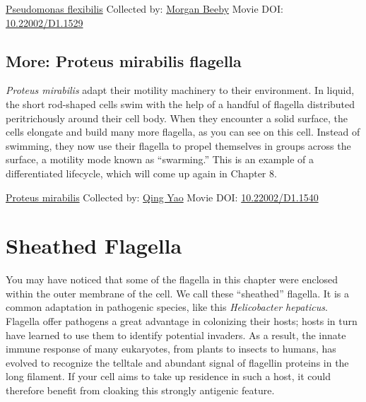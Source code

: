 \documentclass[]{tufte-book}
\begin{document}
\hypertarget{htmlwidget-161c168eb9d6ab718d00}{}

\label{fig:6-5}\protect\hyperlink{tree}{Pseudomonas flexibilis} Collected by: \protect\hyperlink{morgan_beeby}{Morgan Beeby} Movie DOI: \href{https://doi.org/10.22002/D1.1529}{10.22002/D1.1529}

\hypertarget{Proteus_mirabilis_flagella}{%
\subsection*{More: Proteus mirabilis flagella}\label{Proteus_mirabilis_flagella}}

\emph{Proteus mirabilis} adapt their motility machinery to their environment. In liquid, the short rod-shaped cells swim with the help of a handful of flagella distributed peritrichously around their cell body. When they encounter a solid surface, the cells elongate and build many more flagella, as you can see on this cell. Instead of swimming, they now use their flagella to propel themselves in groups across the surface, a motility mode known as ``swarming.'' This is an example of a differentiated lifecycle, which will come up again in Chapter 8.



\hypertarget{htmlwidget-b0ef950996acb302b911}{}

\label{fig:6-5a}\protect\hyperlink{tree}{Proteus mirabilis} Collected by: \protect\hyperlink{qing_yao}{Qing Yao} Movie DOI: \href{https://doi.org/10.22002/D1.1540}{10.22002/D1.1540}

\hypertarget{sheathed-flagella}{%
\section{Sheathed Flagella}\label{sheathed-flagella}}

You may have noticed that some of the flagella in this chapter were enclosed within the outer membrane of the cell. We call these ``sheathed'' flagella. It is a common adaptation in pathogenic species, like this \emph{Helicobacter hepaticus}. Flagella offer pathogens a great advantage in colonizing their hosts; hosts in turn have learned to use them to identify potential invaders. As a result, the innate immune response of many eukaryotes, from plants to insects to humans, has evolved to recognize the telltale and abundant signal of flagellin proteins in the long filament. If your cell aims to take up residence in such a host, it could therefore benefit from cloaking this strongly antigenic feature.
\end{document}
